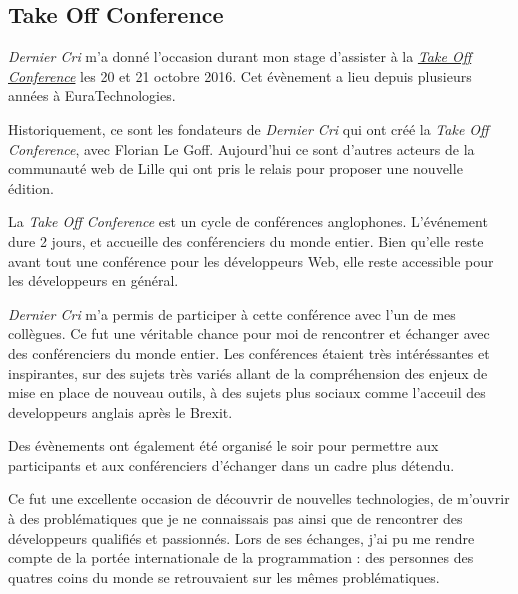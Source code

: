 \bigskip

\subsection{Take Off Conference}\label{take-off-conference}

\bigskip

\emph{Dernier Cri} m'a donné l'occasion durant mon stage d'assister à la
\href{http://takeoffconf.com/2016}{\emph{Take Off Conference}} les 20 et
21 octobre 2016. Cet évènement a lieu depuis plusieurs années à
EuraTechnologies.

\bigskip

Historiquement, ce sont les fondateurs de \emph{Dernier Cri} qui ont
créé la \emph{Take Off Conference}, avec Florian Le Goff. Aujourd'hui ce
sont d'autres acteurs de la communauté web de Lille qui ont pris le
relais pour proposer une nouvelle édition.

\bigskip

La \emph{Take Off Conference} est un cycle de conférences anglophones.
L'événement dure 2 jours, et accueille des conférenciers du monde
entier. Bien qu'elle reste avant tout une conférence pour les
développeurs Web, elle reste accessible pour les développeurs en
général.

\bigskip

\emph{Dernier Cri} m'a permis de participer à cette conférence avec l'un
de mes collègues. Ce fut une véritable chance pour moi de rencontrer et
échanger avec des conférenciers du monde entier. Les conférences étaient
très intéréssantes et inspirantes, sur des sujets très variés allant de
la compréhension des enjeux de mise en place de nouveau outils, à des
sujets plus sociaux comme l'acceuil des developpeurs anglais après le
Brexit.

\bigskip

Des évènements ont également été organisé le soir pour permettre aux
participants et aux conférenciers d'échanger dans un cadre plus détendu.

\bigskip

Ce fut une excellente occasion de découvrir de nouvelles technologies,
de m'ouvrir à des problématiques que je ne connaissais pas ainsi que de
rencontrer des développeurs qualifiés et passionnés. Lors de ses
échanges, j'ai pu me rendre compte de la portée internationale de la
programmation : des personnes des quatres coins du monde se retrouvaient
sur les mêmes problématiques.

\bigskip

